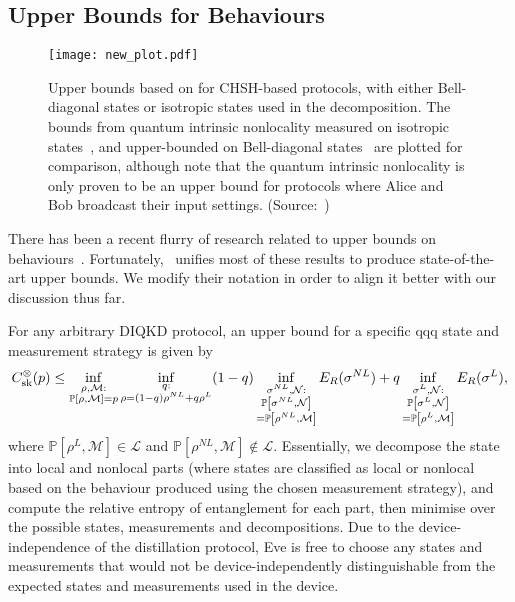 \documentclass[10pt, a4paper]{article}
\numberwithin{equation}{section} %
\theoremstyle{definition}
\theoremstyle{plain}
\newcommand{\?}{\mathrel{?}} %
\newcommand{\sM}{\mathcal{M}}
\newcommand{\sN}{\mathcal{N}}
\newcommand{\Ls}{\mathcal{L}}
\newcommand{\behav}[2]{\mathbb{P}\left[#1, #2\right]}
\newcommand{\sk}{\rm sk}
\begin{document}
    \subsection{Upper Bounds for Behaviours}\label{sec:diqkd_ubehav}

    \begin{figure}
      \centering
      \texttt{[image: new\_plot.pdf]}
      \caption[Comparison of upper bounds for CHSH-based protocols.]{\label{fig:genubound} Upper bounds based on  for CHSH-based protocols, with either Bell-diagonal states or isotropic states used in the decomposition. The bounds from quantum intrinsic nonlocality measured on isotropic states~\cite{DIQKD_Limits}, and upper-bounded on Bell-diagonal states~\cite[Appendix B]{RevisedPeres} are plotted for comparison, although note that the quantum intrinsic nonlocality is only proven to be an upper bound for protocols where Alice and Bob broadcast their input settings. (Source:~\cite{CCSquashedEntangle})}
    \end{figure}

    There has been a recent flurry of research related to upper bounds on behaviours~\cite{NotSufficient, RevisedPeres, DIQKD_QKD_Gap, CCSquashedEntangle, DIQKD_Limits}. Fortunately,~\cite{CCSquashedEntangle} unifies most of these results to produce state-of-the-art upper bounds. We modify their notation in order to align it better with our discussion thus far.

    For any arbitrary DIQKD protocol, an upper bound for a specific qqq state and measurement strategy is given by~\cite[Thm 3]{CCSquashedEntangle}
    \begin{equation}\label{eqn:genubound_state}
    C^{\otimes}_{\sk}(p) \leq \inf_{\substack{\rho,\sM : \\ \behav{\rho}{ \sM} = p}} \inf_{\substack{q : \\ \rho = (1-q)\rho^{NL} + q\rho^L}} (1-q) \inf_{\substack{\sigma^{NL}, \sN : \\ \behav{\sigma^{NL}}{ \sN} \\ = \behav{\rho^{NL}}{ \sM} }} E_R(\sigma^{NL}) + q \inf_{\substack{\sigma^L, \sN : \\ \behav{\sigma^L}{ \sN} \\ = \behav{\rho^L}{ \sM} }} E_R(\sigma^L),
    \end{equation}
  where \(\behav{\rho^L}{ \sM} \in \Ls\) and \(\behav{\rho^{NL}}{ \sM} \not\in \Ls\). Essentially, we decompose the state into local and nonlocal parts (where states are classified as local or nonlocal based on the behaviour produced using the chosen measurement strategy), and compute the relative entropy of entanglement for each part, then minimise over the possible states, measurements and decompositions. Due to the device-independence of the distillation protocol, Eve is free to choose any states and measurements that would not be device-independently distinguishable from the expected states and measurements used in the device.
\end{document}
